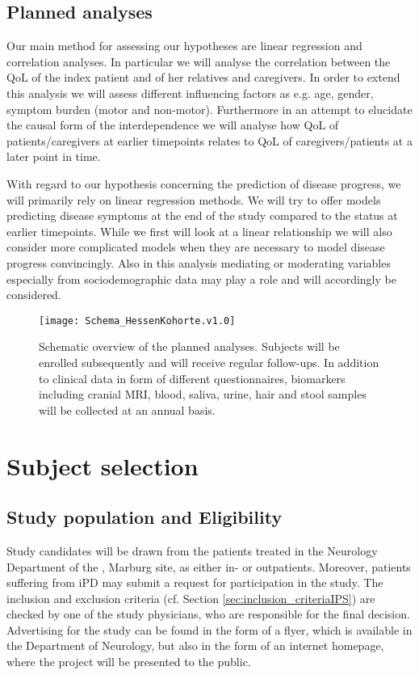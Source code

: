 \subsection{Planned analyses}
Our main method for assessing our hypotheses are linear regression and correlation analyses. In particular we will analyse the correlation between the \ac{QoL} of the index patient and of her relatives and caregivers. In order to extend this analysis we will assess different influencing factors as e.g. age, gender, symptom burden (motor and non-motor). Furthermore in an attempt to elucidate the causal form of the interdependence we will analyse how \ac{QoL} of patients/caregivers at earlier timepoints relates to \ac{QoL} of caregivers/patients at a later point in time.

With regard to our hypothesis concerning the prediction of disease progress, we will primarily rely on linear regression methods. We will try to offer models predicting disease symptoms at the end of the study compared to the status at earlier timepoints. While we first will look at a linear relationship we will also consider more complicated models when they are necessary to model disease progress convincingly. Also in this analysis mediating or moderating variables especially from sociodemographic data may play a role and will accordingly be considered.

\begin{figure}[h]
\label{fig2:scheme}
\centering
\texttt{[image: Schema\_HessenKohorte.v1.0]}
\caption{Schematic overview of the planned analyses. Subjects will be enrolled subsequently and will receive regular follow-ups. In addition to clinical data in form of different questionnaires, biomarkers including cranial \ac{MRI}, blood, saliva, urine, hair and stool samples will be collected at an annual basis.}
\end{figure}


\section{Subject selection}
\label{sec:study_selection}
\subsection{Study population and Eligibility}
\label{sec:study_population}
Study candidates will be drawn from the patients treated in the Neurology Department of the \UKGM, Marburg site, as either in- or outpatients. Moreover, patients suffering from \ac{iPD} may submit a request for participation in the study. The inclusion and exclusion criteria (cf. Section \ref{sec:inclusion_criteriaIPS}) are checked by one of the study physicians, who are responsible for the final decision. Advertising for the study can be found in the form of a flyer, which is available in the Department of Neurology, but also in the form of an internet homepage, where the project will be presented to the public.

